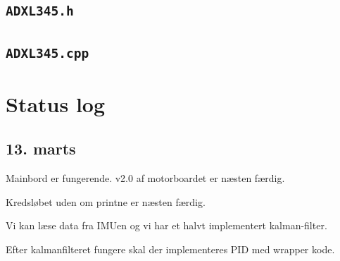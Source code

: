 \documentclass[a4paper,oneside,article,danish,table]{memoir}
\begin{document}
\section{\texttt{ADXL345.h}}

\section{\texttt{ADXL345.cpp}}


\chapter{Status log}

\section{13. marts}
Mainbord er fungerende. v2.0 af motorboardet er næsten færdig.

Kredsløbet uden om printne er næsten færdig.

Vi kan læse data fra IMUen og vi har et halvt implementert kalman-filter.

Efter kalmanfilteret fungere skal der implementeres PID med wrapper kode.
\end{document}
